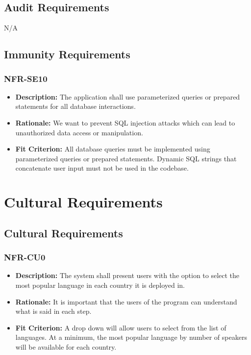 \documentclass[12pt]{article}
\begin{document}
\subsection{Audit Requirements}
N/A
\subsection{Immunity Requirements}
\subsubsection*{NFR-SE10}
\label{sec:SE10}
\begin{itemize}
  \item \textbf{Description:} The application shall use parameterized queries or prepared statements for all database interactions.
  \item \textbf{Rationale:} We want to prevent SQL injection attacks which can lead to unauthorized data access or manipulation.
  \item \textbf{Fit Criterion:} All database queries must be implemented using parameterized queries or prepared statements. Dynamic SQL strings that concatenate user input must not be used in the codebase.
\end{itemize}

\section{Cultural Requirements}
\subsection{Cultural Requirements}
\subsubsection*{NFR-CU0}
\label{sec:CU0}
\begin{itemize}
  \item \textbf{Description:} The system shall present users with the option to select the most popular language in each country it is deployed in.
  \item \textbf{Rationale:} It is important that the users of the program can understand what is said in each step.
  \item \textbf{Fit Criterion:} A drop down will allow users to select from the list of languages. At a minimum, the most popular language by number of speakers will be available for each country.
\end{itemize}
\end{document}
